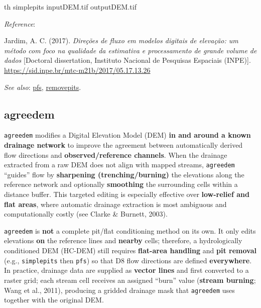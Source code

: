 \documentclass[
]{book}
\newenvironment{Shaded}{\begin{snugshade}}{\end{snugshade}}
\newcommand{\ExtensionTok}[1]{#1}
\newcommand{\NormalTok}[1]{#1}
\theoremstyle{definition}
\theoremstyle{definition}
\theoremstyle{definition}
\theoremstyle{definition}
\theoremstyle{remark}
\begin{document}
\begin{Shaded}
\begin{Highlighting}[]
\ExtensionTok{th}\NormalTok{ simplepits inputDEM.tif outputDEM.tif}
\end{Highlighting}
\end{Shaded}

\emph{Reference}:

Jardim, A. C. (2017). \emph{Direções de fluxo em modelos digitais de elevação: um método com foco na qualidade da estimativa e processamento de grande volume de dados} {[}Doctoral dissertation, Instituto Nacional de Pesquisas Espaciais (INPE){]}. \href{http://mtc-m21b.sid.inpe.br/col/sid.inpe.br/mtc-m21b/2017/05.17.13.26/doc/publicacao.pdf?metadatarepository=sid.inpe.br/mtc-m21b/2017/05.17.13.26.57&mirror=sid.inpe.br/mtc-m21b/2013/09.26.14.25.22&languagebutton=en}{https://sid.inpe.br/mtc-m21b/2017/05.17.13.26}

\emph{See also}: \hyperref[pfs]{pfs}, \hyperref[removepits]{removepits}.

\subsection{agreedem}\label{agreedem}

\texttt{agreedem} modifies a Digital Elevation Model (DEM) \textbf{in and around a known drainage network} to improve the agreement between automatically derived flow directions and \textbf{observed/reference channels}. When the drainage extracted from a raw DEM does not align with mapped streams, \texttt{agreedem} ``guides'' flow by \textbf{sharpening (trenching/burning)} the elevations along the reference network and optionally \textbf{smoothing} the surrounding cells within a distance buffer. This targeted editing is especially effective over \textbf{low-relief and flat areas}, where automatic drainage extraction is most ambiguous and computationally costly (see Clarke \& Burnett, 2003).

\texttt{agreedem} is \textbf{not} a complete pit/flat conditioning method on its own. It only edits elevations \textbf{on} the reference lines and \textbf{nearby} cells; therefore, a hydrologically conditioned DEM (HC-DEM) still requires \textbf{flat-area handling} and \textbf{pit removal} (e.g., \texttt{simplepits} then \texttt{pfs}) so that D8 flow directions are defined \textbf{everywhere}. In practice, drainage data are supplied as \textbf{vector lines} and first converted to a raster grid; each stream cell receives an assigned ``burn'' value (\textbf{stream burning}; Wang et al., 2011), producing a gridded drainage mask that \texttt{agreedem} uses together with the original DEM.
\end{document}
